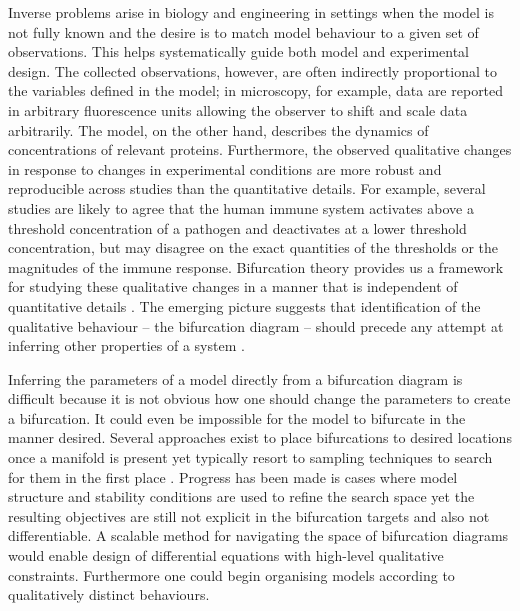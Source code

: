 Inverse problems \cite{Abdulla2009InverseBiology} arise in biology and engineering in settings when the model is not fully known and the desire is to match model behaviour to a given set of observations. This helps systematically guide both model and experimental design. The collected observations, however, are often indirectly proportional to the variables defined in the model; in microscopy, for example, data are reported in arbitrary fluorescence units allowing the observer to shift and scale data arbitrarily. The model, on the other hand, describes the dynamics of concentrations of relevant proteins. Furthermore, the observed qualitative changes in response to changes in experimental conditions are more robust and reproducible across studies than the quantitative details. For example, several studies are likely to agree that the human immune system activates above a threshold concentration of a pathogen and deactivates at a lower threshold concentration, but may disagree on the exact quantities of the thresholds or the magnitudes of the immune response. Bifurcation theory provides us a framework for studying these qualitative changes in a manner that is independent of quantitative details \cite{Kuznetsov2004TopologicalSystems}. The emerging picture suggests that identification of the qualitative behaviour -- the bifurcation diagram -- should precede any attempt at inferring other properties of a system \cite{Stumpf2019ParameterBifurcations}.

Inferring the parameters of a model directly from a bifurcation diagram is difficult because it is not obvious how one should change the parameters to create a bifurcation. It could even be impossible for the model to bifurcate in the manner desired. Several approaches exist to place bifurcations to desired locations once a manifold is present \cite{Iwasaki1997AnType,Lu2006InverseSystems,Dobson2004DistanceBifurcations} yet typically resort to sampling techniques to search for them in the first place \cite{Chickarmane2005BifurcationTool,Conrad2006BifurcationClock}. Progress has been made is cases where model structure and stability conditions are used to refine the search space \cite{Otero-Muras2018Optimization-basedModels,Otero-Muras2014ACurves} yet the resulting objectives are still not explicit in the bifurcation targets and also not differentiable. A scalable method for navigating the space of bifurcation diagrams would enable design of differential equations with high-level qualitative constraints. Furthermore one could begin organising models according to qualitatively distinct behaviours.

